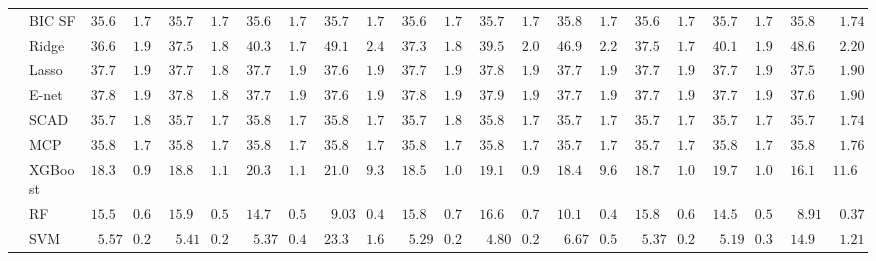 \begin{tabular}{ll|ll|llllll|llllll|llllll}
 & BIC SF  & $35.65$ & $1.79$ & $35.71$ & $1.75$ & $35.67$ & $1.76$ & $35.70$ & $1.74$ & $35.65$ & $1.79$ & $35.72$ & $1.74$ & $35.80$ & $1.72$ & $35.62$ & $1.74$ & $35.71$ & $1.78$ & $35.81$ & $\phantom{0}1.74$ \\
 & Ridge  & $36.64$ & $1.91$ & $37.58$ & $1.84$ & $40.37$ & $1.78$ & $49.19$ & $2.46$ & $37.36$ & $1.87$ & $39.50$ & $2.02$ & $46.91$ & $2.21$ & $37.51$ & $1.76$ & $40.12$ & $1.92$ & $48.65$ & $\phantom{0}2.20$ \\
 & Lasso  & $37.74$ & $1.90$ & $37.75$ & $1.88$ & $37.72$ & $1.90$ & $37.60$ & $1.91$ & $37.79$ & $1.93$ & $37.89$ & $1.91$ & $37.70$ & $1.96$ & $37.74$ & $1.91$ & $37.74$ & $1.90$ & $37.56$ & $\phantom{0}1.90$ \\
 & E-net  & $37.82$ & $1.92$ & $37.82$ & $1.88$ & $37.74$ & $1.92$ & $37.60$ & $1.92$ & $37.85$ & $1.95$ & $37.96$ & $1.93$ & $37.70$ & $1.97$ & $37.79$ & $1.93$ & $37.79$ & $1.91$ & $37.60$ & $\phantom{0}1.90$ \\
 & SCAD  & $35.76$ & $1.80$ & $35.79$ & $1.77$ & $35.83$ & $1.75$ & $35.88$ & $1.71$ & $35.76$ & $1.80$ & $35.81$ & $1.73$ & $35.73$ & $1.72$ & $35.78$ & $1.77$ & $35.79$ & $1.77$ & $35.78$ & $\phantom{0}1.74$ \\
 & MCP  & $35.80$ & $1.77$ & $35.83$ & $1.76$ & $35.84$ & $1.76$ & $35.88$ & $1.72$ & $35.82$ & $1.76$ & $35.85$ & $1.70$ & $35.76$ & $1.72$ & $35.79$ & $1.78$ & $35.82$ & $1.76$ & $35.80$ & $\phantom{0}1.76$ \\
 & XGBoost  & $18.39$ & $0.92$ & $18.87$ & $1.10$ & $20.32$ & $1.10$ & $21.07$ & $9.31$ & $18.54$ & $1.08$ & $19.18$ & $0.99$ & $18.46$ & $9.67$ & $18.76$ & $1.03$ & $19.70$ & $1.07$ & $16.19$ & $11.69$ \\
 & RF  & $15.56$ & $0.64$ & $15.98$ & $0.59$ & $14.74$ & $0.58$ & $\phantom{0}9.03$ & $0.41$ & $15.81$ & $0.73$ & $16.68$ & $0.70$ & $10.18$ & $0.48$ & $15.84$ & $0.60$ & $14.51$ & $0.53$ & $\phantom{0}8.91$ & $\phantom{0}0.37$ \\
 & SVM  & $\phantom{0}5.57$ & $0.25$ & $\phantom{0}5.41$ & $0.24$ & $\phantom{0}5.37$ & $0.43$ & $23.34$ & $1.62$ & $\phantom{0}5.29$ & $0.24$ & $\phantom{0}4.80$ & $0.22$ & $\phantom{0}6.67$ & $0.53$ & $\phantom{0}5.37$ & $0.27$ & $\phantom{0}5.19$ & $0.33$ & $14.98$ & $\phantom{0}1.21$ \\
\hline 
\end{tabular}

